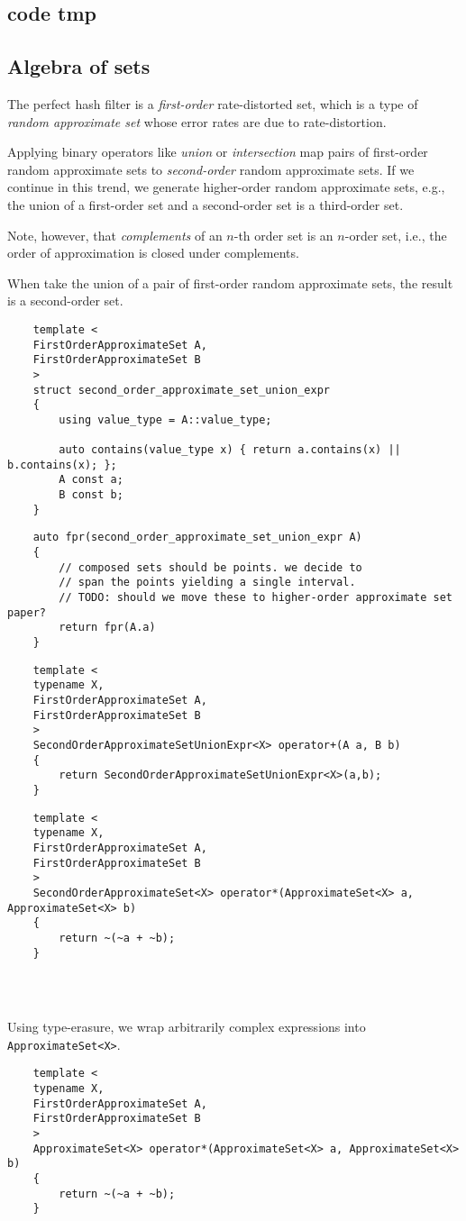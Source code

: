 \documentclass[ ../main.tex]{subfiles}
\begin{document}
\subsection{code tmp}

\subsection{Algebra of sets}
The perfect hash filter is a \emph{first-order} rate-distorted set, which is a type of \emph{random approximate set} whose error rates are due to rate-distortion.

Applying binary operators like \emph{union} or \emph{intersection} map pairs of first-order random approximate sets to \emph{second-order} random approximate sets.
If we continue in this trend, we generate higher-order random approximate sets, e.g., the union of a first-order set and a second-order set is a third-order set.

Note, however, that \emph{complements} of an $n$-th order set is an $n$-order set, i.e., the order of approximation is closed under complements.


When take the union of a pair of first-order random approximate sets, the result is a second-order set.


\begin{verbatim}
	template <
	FirstOrderApproximateSet A,
	FirstOrderApproximateSet B
	>
	struct second_order_approximate_set_union_expr
	{
		using value_type = A::value_type;
		
		auto contains(value_type x) { return a.contains(x) || b.contains(x); };
		A const a;
		B const b;	
	}
\end{verbatim}

\begin{verbatim}
	auto fpr(second_order_approximate_set_union_expr A)
	{
		// composed sets should be points. we decide to
		// span the points yielding a single interval.
		// TODO: should we move these to higher-order approximate set paper?
		return fpr(A.a)
	}
\end{verbatim}


\begin{verbatim}
	template <
	typename X,
	FirstOrderApproximateSet A,
	FirstOrderApproximateSet B
	>
	SecondOrderApproximateSetUnionExpr<X> operator+(A a, B b)
	{
		return SecondOrderApproximateSetUnionExpr<X>(a,b);
	}
\end{verbatim}


\begin{verbatim}
	template <
	typename X,
	FirstOrderApproximateSet A,
	FirstOrderApproximateSet B
	>
	SecondOrderApproximateSet<X> operator*(ApproximateSet<X> a, ApproximateSet<X> b)
	{
		return ~(~a + ~b);
	}
	
	
	
\end{verbatim}


Using type-erasure, we wrap arbitrarily complex expressions into \texttt{ApproximateSet<X>}.
\begin{verbatim}
	template <
	typename X,
	FirstOrderApproximateSet A,
	FirstOrderApproximateSet B
	>
	ApproximateSet<X> operator*(ApproximateSet<X> a, ApproximateSet<X> b)
	{
		return ~(~a + ~b);
	}
\end{verbatim}
\end{document}
